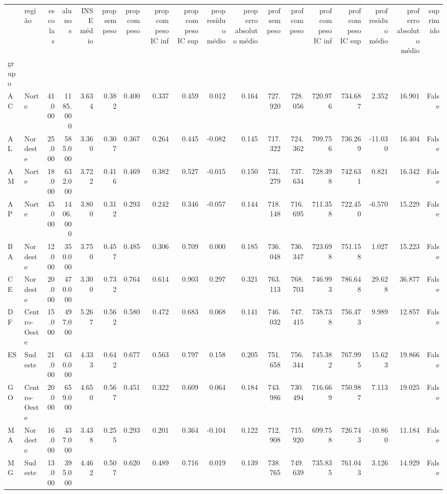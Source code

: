 \begin{tabular}{llrrrrrrrrrrrrrrrr}
\toprule
 & região & escolas & alunos & INSE médio & prop sem peso & prop com peso & prop com peso IC inf & prop com peso IC sup & prop resíduo médio & prop erro absoluto médio & prof sem peso & prof com peso & prof com peso IC inf & prof com peso IC sup & prof resíduo médio & prof erro absoluto médio & suprimido \\
grupo &  &  &  &  &  &  &  &  &  &  &  &  &  &  &  &  &  \\
\midrule
AC & Norte & 41.000 & 1185.000 & 3.634 & 0.382 & 0.400 & 0.337 & 0.459 & 0.012 & 0.164 & 727.920 & 728.056 & 720.976 & 734.687 & 2.352 & 16.901 & False \\
AL & Nordeste & 25.000 & 585.000 & 3.360 & 0.307 & 0.367 & 0.264 & 0.445 & -0.082 & 0.145 & 717.322 & 724.362 & 709.756 & 736.269 & -11.030 & 16.404 & False \\
AM & Norte & 18.000 & 632.000 & 3.722 & 0.416 & 0.469 & 0.382 & 0.527 & -0.015 & 0.150 & 731.279 & 737.634 & 728.398 & 742.631 & 0.821 & 16.342 & False \\
AP & Norte & 45.000 & 1406.000 & 3.800 & 0.312 & 0.293 & 0.242 & 0.346 & -0.057 & 0.144 & 718.148 & 716.695 & 711.358 & 722.450 & -6.570 & 15.229 & False \\
BA & Nordeste & 12.000 & 350.000 & 3.750 & 0.457 & 0.485 & 0.306 & 0.709 & 0.000 & 0.185 & 736.048 & 736.347 & 723.698 & 751.158 & 1.027 & 15.223 & False \\
CE & Nordeste & 20.000 & 470.000 & 3.300 & 0.732 & 0.764 & 0.614 & 0.903 & 0.297 & 0.321 & 763.113 & 768.703 & 746.993 & 786.648 & 29.628 & 36.877 & False \\
DF & Centro-Oeste & 15.000 & 497.000 & 5.267 & 0.562 & 0.580 & 0.472 & 0.683 & 0.068 & 0.141 & 746.032 & 747.415 & 738.738 & 756.473 & 9.989 & 12.857 & False \\
ES & Sudeste & 21.000 & 630.000 & 4.333 & 0.642 & 0.677 & 0.563 & 0.797 & 0.158 & 0.205 & 751.658 & 756.344 & 745.382 & 767.995 & 15.623 & 19.866 & False \\
GO & Centro-Oeste & 20.000 & 659.000 & 4.650 & 0.567 & 0.451 & 0.322 & 0.609 & 0.064 & 0.184 & 743.986 & 730.494 & 716.669 & 750.987 & 7.113 & 19.025 & False \\
MA & Nordeste & 16.000 & 437.000 & 3.438 & 0.255 & 0.293 & 0.201 & 0.364 & -0.104 & 0.122 & 712.908 & 715.920 & 699.758 & 726.743 & -10.860 & 11.184 & False \\
MG & Sudeste & 13.000 & 395.000 & 4.462 & 0.507 & 0.620 & 0.489 & 0.716 & 0.019 & 0.139 & 738.765 & 749.639 & 735.835 & 761.043 & 3.126 & 14.929 & False \\

\end{tabular}
